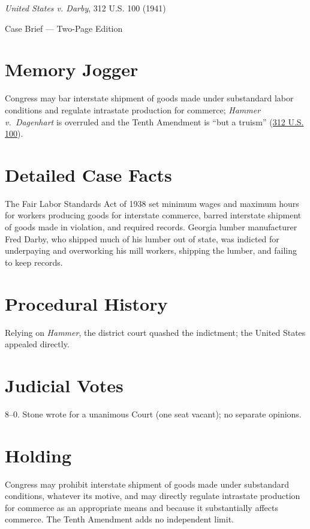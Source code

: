 \documentclass[12pt]{article}
\begin{document}
\begin{center}
{\LARGE \textit{United States v. Darby}, 312 U.S. 100 (1941)\par}
\vspace{0.5em}
{\large Case Brief --- Two-Page Edition\par}
\end{center}

\section{Memory Jogger}
Congress may bar interstate shipment of goods made under substandard labor conditions and regulate intrastate production for commerce; \textit{Hammer v.\ Dagenhart} is overruled and the Tenth Amendment is ``but a truism'' (\href{https://supreme.justia.com/cases/federal/us/312/100/}{312 U.S. 100}).

\section{Detailed Case Facts}
The Fair Labor Standards Act of 1938 set minimum wages and maximum hours for workers producing goods for interstate commerce, barred interstate shipment of goods made in violation, and required records. Georgia lumber manufacturer Fred Darby, who shipped much of his lumber out of state, was indicted for underpaying and overworking his mill workers, shipping the lumber, and failing to keep records.

\section{Procedural History}
Relying on \textit{Hammer}, the district court quashed the indictment; the United States appealed directly.

\section{Judicial Votes}
8--0. Stone wrote for a unanimous Court (one seat vacant); no separate opinions.

\section{Holding}
Congress may prohibit interstate shipment of goods made under substandard conditions, whatever its motive, and may directly regulate intrastate production for commerce as an appropriate means and because it substantially affects commerce. The Tenth Amendment adds no independent limit.
\end{document}
